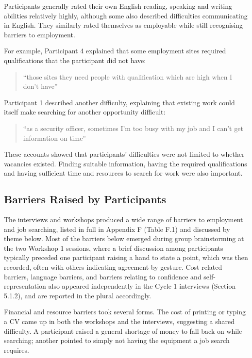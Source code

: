 Participants generally rated their own English reading, speaking and writing abilities relatively highly, although some also described difficulties communicating in English. They similarly rated themselves as employable while still recognising barriers to employment.

For example, Participant 4 explained that some employment sites required qualifications that the participant did not have:

\begin{quote}
``those sites they need people with qualification which are high when I don't have''
\end{quote}

Participant 1 described another difficulty, explaining that existing work could itself make searching for another opportunity difficult:

\begin{quote}
``as a security officer, sometimes I'm too busy with my job and I can't get information on time''
\end{quote}

These accounts showed that participants' difficulties were not limited to whether vacancies existed. Finding suitable information, having the required qualifications and having sufficient time and resources to search for work were also important.

\subsection{Barriers Raised by Participants}
The interviews and workshops produced a wide range of barriers to employment and job searching, listed in full in Appendix F (Table F.1) and discussed by theme below. Most of the barriers below emerged during group brainstorming at the two Workshop 1 sessions, where a brief discussion among participants typically preceded one participant raising a hand to state a point, which was then recorded, often with others indicating agreement by gesture. Cost-related barriers, language barriers, and barriers relating to confidence and self-representation also appeared independently in the Cycle 1 interviews (Section 5.1.2), and are reported in the plural accordingly.

Financial and resource barriers took several forms. The cost of printing or typing a CV came up in both the workshops and the interviews, suggesting a shared difficulty. A participant raised a general shortage of money to fall back on while searching; another pointed to simply not having the equipment a job search requires.


